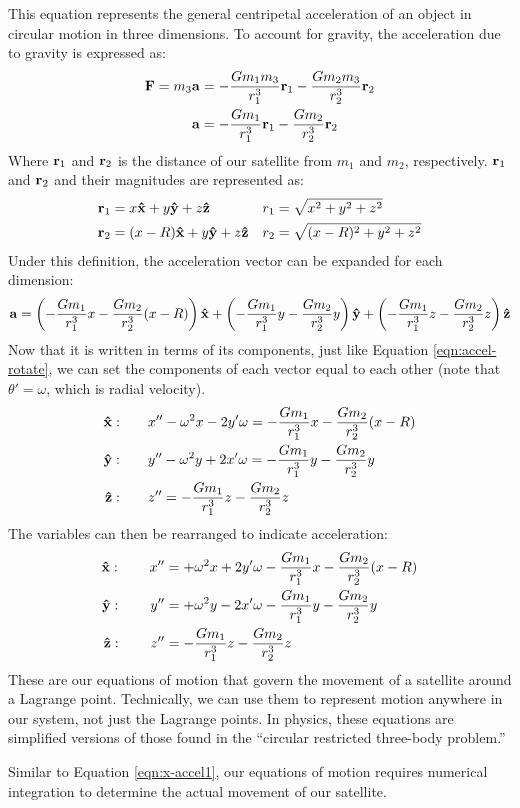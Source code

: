 This equation represents the general centripetal acceleration of an object in circular motion in three dimensions.
To account for gravity, the acceleration due to gravity is expressed as:
\begin{align*}
	\bm{\mathbf{F}} = m_3\bm{\mathbf{a}} &= - \frac{Gm_1m_3}{r_1^3}\bm{\mathbf{r}}_1 - \frac{Gm_2m_3}{r_2^3}\bm{\mathbf{r}}_2 \\
	\bm{\mathbf{a}} &= - \frac{Gm_1}{r_1^3}\bm{\mathbf{r}}_1 - \frac{Gm_2}{r_2^3}\bm{\mathbf{r}}_2
\end{align*}
Where $\bm{\mathbf{r}}_1$ and $\bm{\mathbf{r}}_2$ is the distance of our satellite from $m_1$ and $m_2$, respectively.
$\bm{\mathbf{r}}_1$ and $\bm{\mathbf{r}}_2$ and their magnitudes are represented as:
\begin{align*}
	\bvec{r}_1 &= x\uvec{x} + y\uvec{y} + z\uvec{z} & r_1 &= \sqrt{x^2 + y^2 + z^2} \\
	\bvec{r}_2 &= (x - R)\uvec{x} + y\uvec{y} + z\uvec{z} & r_2 &= \sqrt{(x - R)^2 + y^2 + z^2} 
\end{align*}
Under this definition, the acceleration vector can be expanded for each dimension:
\begin{equation*}
	\bvec{a} = \left(-\frac{Gm_1}{r_1^3}x - \frac{Gm_2}{r_2^3}(x - R)\right)\uvec{x} + \left(-\frac{Gm_1}{r_1^3}y - \frac{Gm_2}{r_2^3}y\right)\uvec{y} + \left(-\frac{Gm_1}{r_1^3}z - \frac{Gm_2}{r_2^3}z\right)\uvec{z}
\end{equation*}
Now that it is written in terms of its components, just like Equation \eqref{eqn:accel-rotate}, we can set the components of each vector equal to each other (note that $\theta' = \omega$, which is radial velocity).
\begin{align*}
	\uvec{x} : \qquad &x'' - \omega^2x - 2y'\omega = -\frac{Gm_1}{r_1^3}x - \frac{Gm_2}{r_2^3}(x - R) \\
	\uvec{y} : \qquad &y'' - \omega^2y + 2x'\omega = -\frac{Gm_1}{r_1^3}y - \frac{Gm_2}{r_2^3}y \\
	\uvec{z} : \qquad &z'' = -\frac{Gm_1}{r_1^3}z - \frac{Gm_2}{r_2^3}z
\end{align*}
The variables can then be rearranged to indicate acceleration:
\begin{align*}
	\uvec{x} : \qquad x'' &= + \omega^2x + 2y'\omega -\frac{Gm_1}{r_1^3}x - \frac{Gm_2}{r_2^3}(x - R) \\
	\uvec{y} : \qquad y'' &= + \omega^2y - 2x'\omega -\frac{Gm_1}{r_1^3}y - \frac{Gm_2}{r_2^3}y \\
	\uvec{z} : \qquad z'' &= -\frac{Gm_1}{r_1^3}z - \frac{Gm_2}{r_2^3}z
\end{align*}
These are our equations of motion that govern the movement of a satellite around a Lagrange point.
Technically, we can use them to represent motion anywhere in our system, not just the Lagrange points.
In physics, these equations are simplified versions of those found in the ``circular restricted three-body problem.''

Similar to Equation \eqref{eqn:x-accel1}, our equations of motion requires numerical integration to determine the actual movement of our satellite.
